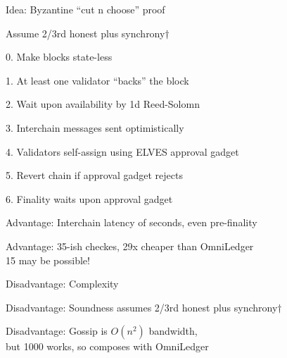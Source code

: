 \documentclass{beamer}
\begin{document}
\begin{frame}

Idea: Byzantine ``cut n choose'' proof \\ \bigskip\bigskip

Assume 2/3rd honest plus synchrony$\dag$ \\ \bigskip

0. Make blocks state-less \\ \medskip

1. At least one validator ``backs'' the block \\ \medskip

2. Wait upon availability by 1d Reed-Solomn \\ \medskip

3. Interchain messages sent optimistically \\ \medskip

4. Validators self-assign using ELVES approval gadget \\ \medskip

5. Revert chain if approval gadget rejects \\ \medskip

6. Finality waits upon approval gadget \\ \medskip

\end{frame}



\begin{frame}

Advantage:  Interchain latency of seconds, even pre-finality \\ \bigskip

Advantage:  35-ish checkes, 29x cheaper than OmniLedger \\ \smallskip
\hspace{10pt} 15 may be possible!

\pause\bigskip\bigskip

Disadvantage:  Complexity \\ \bigskip

Disadvantage:  Soundness assumes 2/3rd honest plus synchrony$\dag$ \\ \bigskip

Disadvantage:  Gossip is $O(n^2)$ bandwidth, \\ \smallskip
\hspace{10pt} but 1000 works, so composes with OmniLedger \\ \bigskip

\end{frame}
\end{document}
